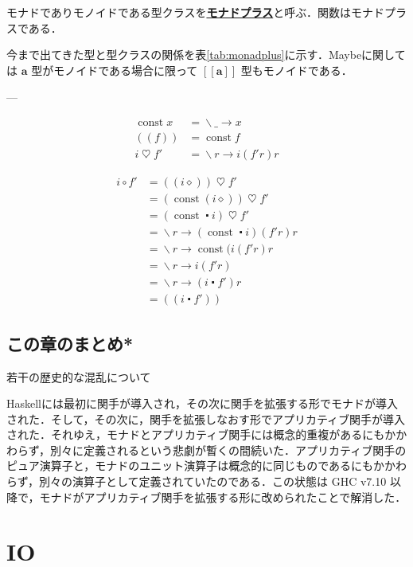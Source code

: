 \documentclass[a4paper,twocolumn]{jsbook}
\def\[{\left[\!\left[}
\def\]{\right]\!\right]}
\def\({\left(\!\left(}
\def\){\right)\!\right)}
\newcommand{\programminglanguage}[1]{\textsf{#1}}
\newcommand{\haskell}{\programminglanguage{Haskell}}
\newenvironment{note}[1]{\begin{boxnote}\begin{center}#1\end{center}}{\end{boxnote}}
\newcommand{\keyword}[1]{{\underline{\textbf{#1}}}}
\newcommand{\mAnonParam}{\diamond}
\newcommand{\mAnyParam}{\_}
\DeclareMathOperator{\mConst}{const}
\DeclareMathOperator{\mBind}{\heartsuit}
\DeclareMathOperator{\mComp}{\centerdot}
\DeclareMathOperator{\mLambda}{\backslash}
\DeclareMathOperator{\mLambdaArrow}{\rightarrow}
\DeclareMathOperator{\mMapFunc}{\circ}
\newcommand{\mType}[1]{\mathbf{#1}}
\newcommand{\mFuncWith}[1]{\(#1\)}
\newcommand{\mMaybeWith}[1]{\[#1\]}
\newcommand{\mMaybeType}[1]{\mMaybeWith{\mType{#1}}}
\newcommand{\mLambdaExp}[2]{\mLambda{#1}\mLambdaArrow{#2}}
\begin{document}
モナドでありモノイドである型クラスを\keyword{モナドプラス}と呼ぶ．関数はモナドプラスである．

今まで出てきた型と型クラスの関係を表\ref{tab:monadplus}に示す．Maybeに関しては $\mType{a}$ 型がモノイドである場合に限って $\mMaybeType{a}$ 型もモノイドである．

---



\begin{align}
\mConst x&=\mLambdaExp{\mAnyParam}{x}\\
\mFuncWith{f}&=\mConst f\\
i\mBind f'&=\mLambdaExp{r}{i(f'r)r}
\end{align}


\begin{align}
i\mMapFunc f'&=\mFuncWith{i\mAnonParam}\mBind f'\\
&=(\mConst(i\mAnonParam))\mBind f'\\
&=(\mConst\mComp i)\mBind f'\\
&=\mLambdaExp{r}{(\mConst\mComp i)(f'r)r}\\
&=\mLambdaExp{r}{\mConst(i(f'r)r}\\
&=\mLambdaExp{r}{i(f'r)}\\
&=\mLambdaExp{r}{(i\mComp f')r}\\
&=\mFuncWith{i\mComp f'} %
\end{align}



\section{この章のまとめ*}

\begin{note}{若干の歴史的な混乱について}
\haskell には最初に関手が導入され，その次に関手を拡張する形でモナドが導入された．そして，その次に，関手を拡張しなおす形でアプリカティブ関手が導入された．それゆえ，モナドとアプリカティブ関手には概念的重複があるにもかかわらず，別々に定義されるという悲劇が暫くの間続いた．アプリカティブ関手のピュア演算子と，モナドのユニット演算子は概念的に同じものであるにもかかわらず，別々の演算子として定義されていたのである．この状態は GHC v7.10 以降で，モナドがアプリカティブ関手を拡張する形に改められたことで解消した．
\end{note}


\chapter{IO}
\label{ch:io}
\end{document}
